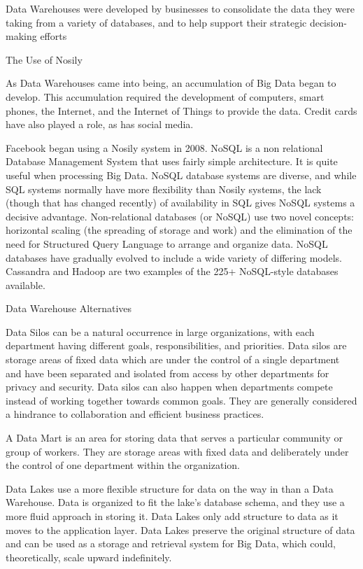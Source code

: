 \documentclass{article}
\begin{document}
Data Warehouses were developed by businesses to consolidate the data they were taking from a variety of databases, and to help support their strategic decision-making efforts

The Use of Nosily

As Data Warehouses came into being, an accumulation of Big Data began to develop. This accumulation required the development of computers, smart phones, the Internet, and the Internet of Things to provide the data. Credit cards have also played a role, as has social media.

Facebook began using a Nosily system in 2008. NoSQL is a non relational Database Management System that uses fairly simple architecture. It is quite useful when processing Big Data. NoSQL database systems are diverse, and while SQL systems normally have more flexibility than Nosily systems, the lack (though that has changed recently) of availability in SQL gives NoSQL systems a decisive advantage. Non-relational databases (or NoSQL) use two novel concepts: horizontal scaling (the spreading of storage and work) and the elimination of the need for Structured Query Language to arrange and organize data. NoSQL databases have gradually evolved to include a wide variety of differing models. Cassandra and Hadoop are two examples of the 225+ NoSQL-style databases available.

Data Warehouse Alternatives

Data Silos can be a natural occurrence in large organizations, with each department having different goals, responsibilities, and priorities. Data silos are storage areas of fixed data which are under the control of a single department and have been separated and isolated from access by other departments for privacy and security. Data silos can also happen when departments compete instead of working together towards common goals. They are generally considered a hindrance to collaboration and efficient business practices.

A Data Mart is an area for storing data that serves a particular community or group of workers. They are storage areas with fixed data and deliberately under the control of one department within the organization.

Data Lakes use a more flexible structure for data on the way in than a Data Warehouse. Data is organized to fit the lake’s database schema, and they use a more fluid approach in storing it. Data Lakes only add structure to data as it moves to the application layer. Data Lakes preserve the original structure of data and can be used as a storage and retrieval system for Big Data, which could, theoretically, scale upward indefinitely.
\end{document}
